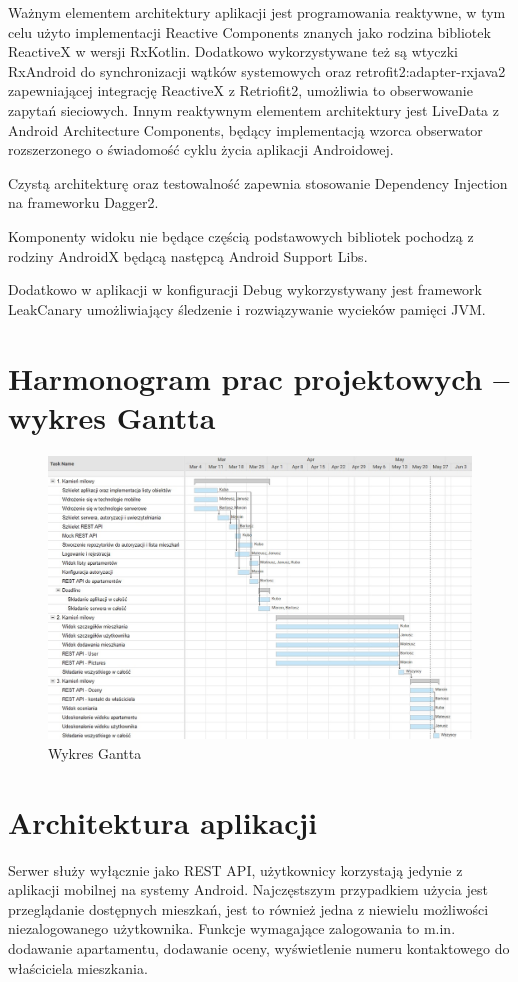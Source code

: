 \documentclass[polish, 11pt]{article}
\begin{document}
    	Ważnym elementem architektury aplikacji jest programowania reaktywne, w tym celu użyto implementacji Reactive Components znanych jako rodzina bibliotek ReactiveX w wersji RxKotlin. Dodatkowo wykorzystywane też są wtyczki RxAndroid do synchronizacji wątków systemowych oraz retrofit2:adapter-rxjava2 zapewniającej integrację ReactiveX z Retriofit2, umożliwia to obserwowanie zapytań sieciowych. Innym reaktywnym elementem architektury jest LiveData z Android Architecture Components, będący implementacją wzorca obserwator rozszerzonego o świadomość cyklu życia aplikacji Androidowej.
    	
    	Czystą architekturę oraz testowalność zapewnia stosowanie Dependency Injection na frameworku Dagger2.
    	
    	Komponenty widoku nie będące częścią podstawowych bibliotek pochodzą z rodziny AndroidX będącą następcą Android Support Libs.
    	
    	Dodatkowo w aplikacji w konfiguracji Debug wykorzystywany jest framework LeakCanary umożliwiający śledzenie i rozwiązywanie wycieków pamięci JVM.     

\section{Harmonogram prac projektowych – wykres Gantta}
    \begin{figure}[H]
        \centering
        \includegraphics[width=\textwidth]{figures/gantt.jpg}
        \caption{Wykres Gantta}
    \end{figure}
    
\section{Architektura aplikacji}
    Serwer służy wyłącznie jako REST API, użytkownicy korzystają jedynie z aplikacji mobilnej na systemy Android.
    Najczęstszym przypadkiem użycia jest przeglądanie dostępnych mieszkań, jest to również jedna z niewielu możliwości niezalogowanego użytkownika.
    Funkcje wymagające zalogowania to m.in. dodawanie apartamentu, dodawanie oceny, wyświetlenie numeru kontaktowego do właściciela mieszkania.
    
\end{document}
